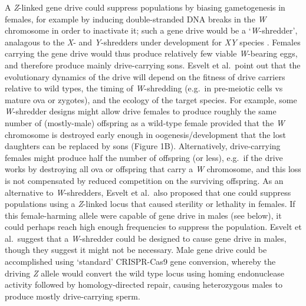 \documentclass[]{rsos}%
\begin{document}
A \emph{Z}-linked gene drive could suppress populations by biasing
gametogenesis in females, for example by inducing double-stranded DNA
breaks in the \emph{W} chromosome in order to inactivate it; such a gene
drive would be a `\emph{W}-shredder', analagous to the \emph{X}- and
\emph{Y}-shredders under development for \emph{XY} species
\citep{windbichler2008ta, north2013mo, galizi2014sy, burt2018se, papathanos2018re, prowse2019}.
Females carrying the gene drive would thus produce relatively few viable
\emph{W}-bearing eggs, and therefore produce mainly drive-carrying sons.
Esvelt et al.~point out that the evolutionary dynamics of the drive will
depend on the fitness of drive carriers relative to wild types, the
timing of \emph{W}-shredding (e.g.~in pre-meiotic cells vs mature ova or
zygotes), and the ecology of the target species. For example, some
\emph{W}-shredder designs might allow drive females to produce roughly
the same number of (mostly-male) offspring as a wild-type female
provided that the \emph{W} chromosome is destroyed early enough in
oogenesis/development that the lost daughters can be replaced by sons
(Figure 1B). Alternatively, drive-carrying females might produce half
the number of offspring (or less), e.g.~if the drive works by destroying
all ova or offspring that carry a \emph{W} chromosome, and this loss is
not compensated by reduced competition on the surviving offspring. As an
alternative to \emph{W}-shredders, Esvelt et al.~also proposed that one
could suppress populations using a \emph{Z}-linked locus that caused
sterility or lethality in females. If this female-harming allele were
capable of gene drive in males (see below), it could perhaps reach high
enough frequencies to suppress the population. Esvelt et al.~suggest
that a \emph{W}-shredder could be designed to cause gene drive in males,
though they suggest it might not be necessary. Male gene drive could be
accomplished using `standard' CRISPR-Cas9 gene conversion, whereby the
driving \emph{Z} allele would convert the wild type locus using homing
endonuclease activity followed by homology-directed repair, causing
heterozygous males to produce mostly drive-carrying sperm.
\end{document}
